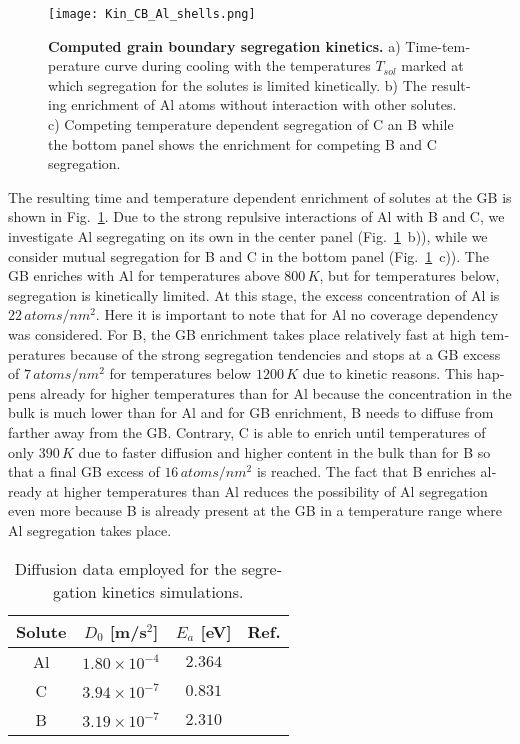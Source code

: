 \documentclass[12pt,a4paper,twoside,twocolumn,english,english]{article}
\begin{document}
\begin{otherlanguage}{english}
\begin{figure}[htbp]
\texttt{[image: Kin\_CB\_Al\_shells.png]}
\caption{\textbf{Computed grain boundary segregation kinetics.} a) Time-temperature curve during cooling with the temperatures $T_{sol}$ marked at which segregation for the solutes is limited kinetically. b) The resulting enrichment of Al atoms without interaction with other solutes. c) Competing temperature dependent segregation of C an B while the bottom panel shows the enrichment for competing B and C segregation.}
\label{fig:kinseg}
\end{figure}

The resulting time and temperature dependent enrichment of solutes at the GB is shown in Fig.~\ref{fig:kinseg}. Due to the strong repulsive interactions of Al with B and C, we investigate Al segregating on its own in the center panel (Fig.~\ref{fig:kinseg}~b)), while we consider mutual segregation for B and C in the bottom panel (Fig.~\ref{fig:kinseg}~c)). The GB enriches with Al for temperatures above $800\,\unit{K}$, but for temperatures below, segregation is kinetically limited. At this stage, the excess concentration of Al is $22\,\unit{atoms/nm^2}$. Here it is important to note that for Al no coverage dependency was considered. For B, the GB enrichment takes place relatively fast at high temperatures because of the strong segregation tendencies and stops at a GB excess of $7\,\unit{atoms/nm^2}$ for temperatures below $1200\,\unit{K}$ due to kinetic reasons. This happens already for higher temperatures than for Al because the concentration in the bulk is much lower than for Al and for GB enrichment, B needs to diffuse from farther away from the GB. Contrary, C is able to enrich until temperatures of only $390\,\unit{K}$ due to faster diffusion and higher content in the bulk than for B so that a final GB excess of $16\,\unit{atoms/nm^2}$ is reached. The fact that B enriches already at higher temperatures than Al reduces the possibility of Al segregation even more because B is already present at the GB in a temperature range where Al segregation takes place.

\begin{table}[htbp]
    \centering
    \begin{tabular}{c|ccc}
        Solute & $D_0$ [m/s$^2$] & $E_a$ [eV] & Ref. \\
        \hline
        Al & $1.80\times 10^{-4}$ & $2.364$ & \cite{mehrer1990diffusion} \\
        C & $3.94\times 10^{-7}$ & $0.831$ & \cite{mehrer1990diffusion} \\
        B & $3.19\times 10^{-7}$ & $2.310$ & \cite{fors_nature_2008}
    \end{tabular}
    \caption{Diffusion data employed for the segregation kinetics simulations.}
    \label{tab:diffdata}
\end{table}




\end{otherlanguage}
\end{document}
